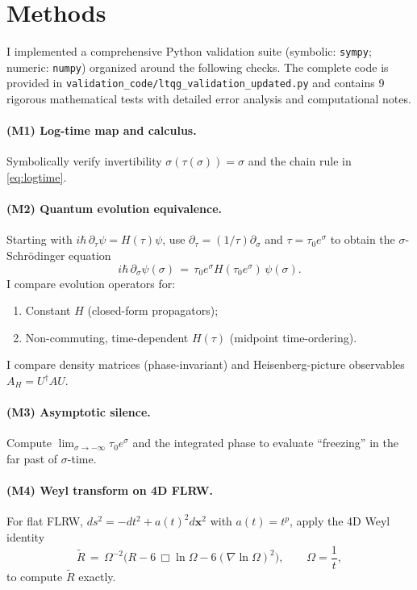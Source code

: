 \documentclass[11pt]{article}
\begin{document}
\section{Methods}
I implemented a comprehensive Python validation suite (symbolic: \texttt{sympy}; numeric: \texttt{numpy}) organized around the following checks. The complete code is provided in \texttt{validation\_code/ltqg\_validation\_updated.py} and contains 9 rigorous mathematical tests with detailed error analysis and computational notes.

\paragraph{(M1) Log-time map and calculus.}
Symbolically verify invertibility $\sigma(\tau(\sigma))=\sigma$ and the chain rule in \eqref{eq:logtime}.

\paragraph{(M2) Quantum evolution equivalence.}
Starting with $i\hbar\,\partial_\tau \psi = H(\tau)\psi$, use $\partial_\tau=(1/\tau)\partial_\sigma$ and $\tau=\tau_0 e^{\sigma}$ to obtain the $\sigma$-Schr\"odinger equation
\begin{equation}
i\hbar\,\partial_\sigma \psi(\sigma) \,=\, \tau_0 e^{\sigma} H(\tau_0 e^{\sigma})\,\psi(\sigma).
\label{eq:sigmaSE}
\end{equation}
I compare evolution operators for:
\begin{enumerate}[leftmargin=1.25em]
\item Constant $H$ (closed-form propagators);
\item Non-commuting, time-dependent $H(\tau)$ (midpoint time-ordering).
\end{enumerate}
I compare density matrices (phase-invariant) and Heisenberg-picture observables $A_H=U^\dagger A U$.

\paragraph{(M3) Asymptotic silence.}
Compute $\lim_{\sigma\to -\infty}\tau_0 e^\sigma$ and the integrated phase to evaluate ``freezing'' in the far past of $\sigma$-time.

\paragraph{(M4) Weyl transform on 4D FLRW.}
For flat FLRW, $ds^2=-dt^2+a(t)^2 d\bm{x}^2$ with $a(t)=t^p$, apply the 4D Weyl identity
\begin{equation}
\tilde R \,=\, \Omega^{-2}\!\big(R - 6\,\Box\ln\Omega - 6(\nabla\ln\Omega)^2\big),
\qquad \Omega=\frac{1}{t},
\label{eq:weylR}
\end{equation}
to compute $\tilde R$ exactly.
\end{document}

